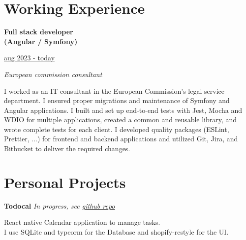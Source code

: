 \documentclass[11pt, oneside, a4paper, titlepage]{article}
\begin{document}
\begin{tcolorbox}[colframe=white, colback=white]
\begin{minipage}[t]{0.35\linewidth}
  \end{minipage}
  \hfill
  \begin{minipage}[t]{0.60\linewidth}

    \section*{Working Experience}

    \begin{minipage}{0.45\linewidth}
      \textbf{Full stack developer} \\ 
      \textbf{(Angular / Symfony)}
    \end{minipage}
    \begin{minipage}{0.5\linewidth}
      \begin{flushright}
        \underline{aug 2023 - today}
      \end{flushright}
    \end{minipage}
    \vspace{0.3cm}

    \emph{European commission consultant} 
    \vspace{0.3cm}

    \small{
      I worked as an IT consultant in the European Commission's legal 
      service department. I ensured proper migrations and maintenance of Symfony 
      and Angular applications. I built and set up end-to-end tests with Jest, 
      Mocha and WDIO for multiple applications, created a common and reusable 
      library, and wrote complete tests for each client. 
      I developed quality packages (ESLint, Prettier, ...) for frontend and 
      backend applications and utilized Git, Jira, and Bitbucket to deliver the 
      required changes.
    }
    \medbreak

    \section*{Personal Projects 
      \small{}
    }

    \textbf{Todocal}
    \emph{In progress, see 
      \href{https://github.com/tamighi/todocal}{\underline{github repo}}
    }
    \medbreak

    \small{
      React native Calendar application to manage tasks. \\
      I use SQLite and typeorm for the Database and shopify-restyle for the UI.
    }


\end{minipage}
\end{tcolorbox}
\end{document}

